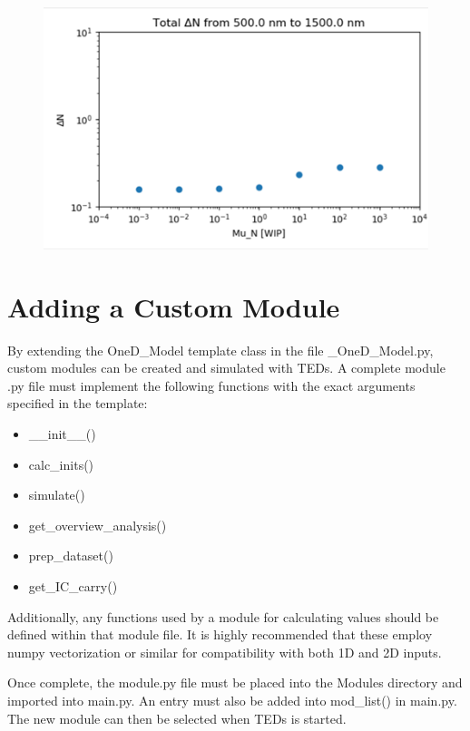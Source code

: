\documentclass[11pt,letterpaper,titlepage]{article}
\begin{document}
		\begin{figure}[H]
			\label{fig:integration_result_adj}
			\centering
			\includegraphics{"integration_result_adj"}
		\end{figure}
	
	\newpage
	\section{Adding a Custom Module}
	
		\par By extending the OneD\_Model template class in the file \_OneD\_Model.py, custom modules can be created and simulated with TEDs. A complete module .py file must implement the following functions with the exact arguments specified in the template:
		
		\begin{itemize}
			\item \_\_init\_\_()
			\item calc\_inits()
			\item simulate()
			\item get\_overview\_analysis()
			\item prep\_dataset()
			\item get\_IC\_carry()
		\end{itemize}
	
		\par Additionally, any functions used by a module for calculating values should be defined within that module file. It is highly recommended that these employ numpy vectorization or similar for compatibility with both 1D and 2D inputs.
	
		\par Once complete, the module.py file must be placed into the Modules directory and imported into main.py. An entry must also be added into mod\_list() in main.py. The new module can then be selected when TEDs is started.
		
\end{document}
